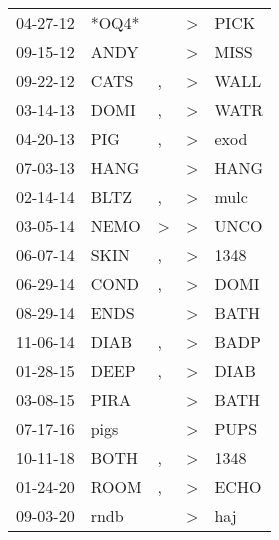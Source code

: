 \begin{supertabular}{p{0.07\textwidth}p{0.06\textwidth}p{0.02\textwidth}p{0.02\textwidth}p{0.06\textwidth}}
 04-27-12\textsuperscript{} &                   *OQ4* &               &  \textgreater &  PICK\textsuperscript{} \\
 09-15-12\textsuperscript{} &  ANDY\textsuperscript{} &               &  \textgreater &  MISS\textsuperscript{} \\
 09-22-12\textsuperscript{} &  CATS\textsuperscript{} &             , &  \textgreater &  WALL\textsuperscript{} \\
 03-14-13\textsuperscript{} &  DOMI\textsuperscript{} &             , &  \textgreater &  WATR\textsuperscript{} \\
 04-20-13\textsuperscript{} &   PIG\textsuperscript{} &             , &  \textgreater &  exod\textsuperscript{} \\
 07-03-13\textsuperscript{} &  HANG\textsuperscript{} &               &  \textgreater &  HANG\textsuperscript{} \\
 02-14-14\textsuperscript{} &  BLTZ\textsuperscript{} &             , &  \textgreater &  mulc\textsuperscript{} \\
 03-05-14\textsuperscript{} &  NEMO\textsuperscript{} &  \textgreater &  \textgreater &  UNCO\textsuperscript{} \\
 06-07-14\textsuperscript{} &  SKIN\textsuperscript{} &             , &  \textgreater &  1348\textsuperscript{} \\
 06-29-14\textsuperscript{} &  COND\textsuperscript{} &             , &  \textgreater &  DOMI\textsuperscript{} \\
 08-29-14\textsuperscript{} &  ENDS\textsuperscript{} &               &  \textgreater &  BATH\textsuperscript{} \\
 11-06-14\textsuperscript{} &  DIAB\textsuperscript{} &             , &  \textgreater &  BADP\textsuperscript{} \\
 01-28-15\textsuperscript{} &  DEEP\textsuperscript{} &             , &  \textgreater &  DIAB\textsuperscript{} \\
 03-08-15\textsuperscript{} &  PIRA\textsuperscript{} &               &  \textgreater &  BATH\textsuperscript{} \\
 07-17-16\textsuperscript{} &  pigs\textsuperscript{} &               &  \textgreater &  PUPS\textsuperscript{} \\
 10-11-18\textsuperscript{} &  BOTH\textsuperscript{} &             , &  \textgreater &  1348\textsuperscript{} \\
 01-24-20\textsuperscript{} &  ROOM\textsuperscript{} &             , &  \textgreater &  ECHO\textsuperscript{} \\
 09-03-20\textsuperscript{} &  rndb\textsuperscript{} &               &  \textgreater &   haj\textsuperscript{} \\
\end{supertabular}
